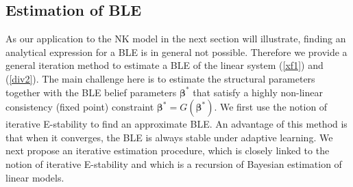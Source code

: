 \subsection{Estimation of BLE}
\label{sec:iterative_ble}

As our application to the NK model in the next section will illustrate, finding an analytical expression for a BLE is in general not possible. Therefore we provide a general iteration method to estimate a BLE of the linear system (\ref{xf1}) and (\ref{div2}). The main challenge here is to estimate the structural parameters together with the BLE belief parameters $\pmb{\beta}^{*}$ that satisfy a highly non-linear consistency (fixed point) constraint $\pmb{\beta}^{*}=G(\pmb{\beta}^{*})$. We first use the notion of iterative E-stability to find an approximate BLE. An advantage of this method is that when it converges, the BLE is always stable under adaptive learning. We next propose an iterative estimation procedure, which is closely linked to the notion of iterative E-stability and which is a recursion of Bayesian estimation of linear models. 


